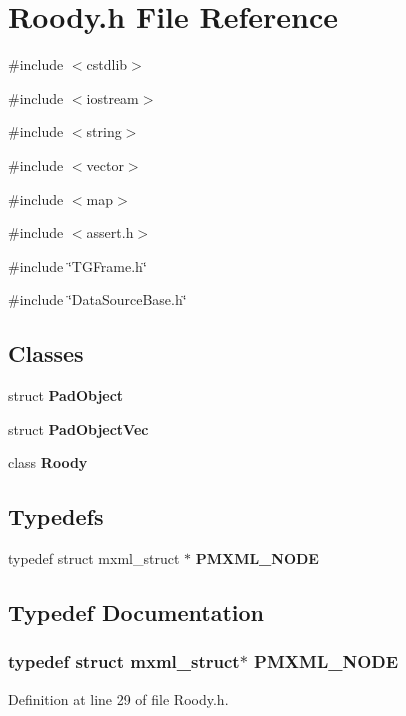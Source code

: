 \section{Roody.h File Reference}
\label{Roody_8h}
{\ttfamily \#include $<$cstdlib$>$}\par
{\ttfamily \#include $<$iostream$>$}\par
{\ttfamily \#include $<$string$>$}\par
{\ttfamily \#include $<$vector$>$}\par
{\ttfamily \#include $<$map$>$}\par
{\ttfamily \#include $<$assert.h$>$}\par
{\ttfamily \#include \char`\"{}TGFrame.h\char`\"{}}\par
{\ttfamily \#include \char`\"{}DataSourceBase.h\char`\"{}}\par
\subsection*{Classes}
\begin{DoxyCompactItemize}
\item 
struct {\bf PadObject}
\item 
struct {\bf PadObjectVec}
\item 
class {\bf Roody}
\end{DoxyCompactItemize}
\subsection*{Typedefs}
\begin{DoxyCompactItemize}
\item 
typedef struct mxml\_\-struct $\ast$ {\bf PMXML\_\-NODE}
\end{DoxyCompactItemize}


\subsection{Typedef Documentation}
\subsubsection[{PMXML\_\-NODE}]{\setlength{\rightskip}{0pt plus 5cm}typedef struct mxml\_\-struct$\ast$ {\bf PMXML\_\-NODE}}\label{Roody_8h_ab6cc71ff10d6d49f8d93aee33c3c2810}


Definition at line 29 of file Roody.h.